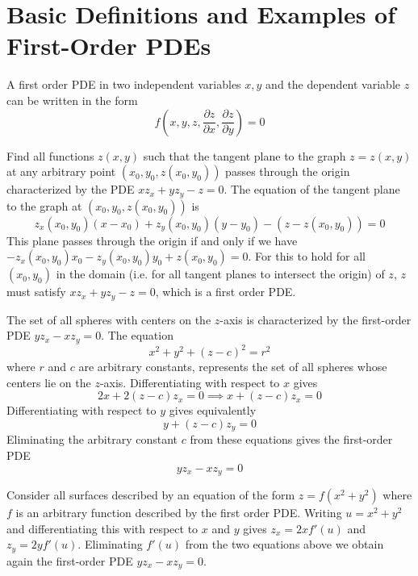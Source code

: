 \documentclass[12pt, a4paper, oneside, openright, titlepage]{book}
\begin{document}
\section{Basic Definitions and Examples of First-Order PDEs}

\begin{defn}
    A first order PDE in two independent variables $x,y$ and the dependent variable $z$ can be written in the form \begin{equation}
        f\left(x,y,z,\frac{\partial z}{\partial x},\frac{\partial z}{\partial y}\right) = 0 
    \end{equation}
\end{defn}

\begin{eg}
    Find all functions $z(x,y)$ such that the tangent plane to the graph $z = z(x,y)$ at any arbitrary point $(x_0,y_0,z(x_0,y_0))$ passes through the origin characterized by the PDE $xz_x+yz_y - z=0$. The equation of the tangent plane to the graph at $(x_0,y_0,z(x_0,y_0))$ is \begin{equation*}
        z_x(x_0,y_0)(x-x_0) + z_y(x_0,y_0)(y-y_0)-(z-z(x_0,y_0)) = 0
    \end{equation*}
    This plane passes through the origin if and only if we have $-z_x(x_0,y_0)x_0 - z_y(x_0,y_0)y_0+z(x_0,y_0) = 0$. For this to hold for all $(x_0,y_0)$ in the domain (i.e. for all tangent planes to intersect the origin) of $z$, $z$ must satisfy $xz_x + yz_y - z = 0$, which is a first order PDE.
\end{eg}

\begin{eg}
    The set of all spheres with centers on the $z$-axis is characterized by the first-order PDE $yz_x-xz_y = 0$. The equation $$x^2+y^2+(z-c)^2=r^2$$ where $r$ and $c$ are arbitrary constants, represents the set of all spheres whose centers lie on the $z$-axis. Differentiating with respect to $x$ gives $$2x+2(z-c)z_x = 0\implies x+(z-c)z_x = 0$$ Differentiating with respect to $y$ gives equivalently $$y+(z-c)z_y = 0$$ Eliminating the arbitrary constant $c$ from these equations gives the first-order PDE $$yz_x-xz_y = 0$$
\end{eg}

\begin{eg}
    Consider all surfaces described by an equation of the form $z = f(x^2+y^2)$ where $f$ is an arbitrary function described by the first order PDE. Writing $u = x^2+y^2$ and differentiating this with respect to $x$ and $y$ gives $z_x = 2xf'(u)$ and $z_y = 2yf'(u)$. Eliminating $f'(u)$ from the two equations above we obtain again the first-order PDE $yz_x - xz_y = 0$.
\end{eg}
\end{document}
